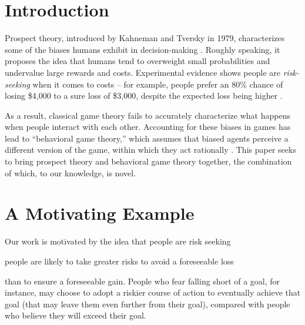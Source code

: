 \documentclass[twoside]{article}
\begin{document}
\begin{multicols}{2} %

\section{Introduction}
Prospect theory, introduced by Kahneman and Tversky in 1979, characterizes some
of the biases humans exhibit in decision-making \cite{Kahneman1979}. Roughly
speaking, it proposes the idea that humans tend to overweight small
probabilities and undervalue large rewards and costs. Experimental evidence
shows people are \textit{risk-seeking} when it comes to costs -- for example,
people prefer an 80\% chance of losing \$4,000 to a sure loss of \$3,000,
despite the expected loss being higher \cite{Kahneman1979}.

As a result, classical game theory fails to accurately characterize what happens
when people interact with each other. Accounting for these biases in games has
lead to ``behavioral game theory,'' which assumes that biased agents perceive a
different version of the game, within which they act rationally \cite{Meir2014}.
This paper seeks to bring prospect theory and behavioral game theory together,
the combination of which, to our knowledge, is novel.

\section{A Motivating Example}

Our work is motivated by the idea that people are risk seeking 

people are likely to take greater risks to avoid a foreseeable loss

 than to ensure a foreseeable gain. People who fear falling short
of a goal, for instance, may choose to adopt a riskier course of action to eventually
achieve that goal (that may leave them even further from their goal), compared with
people who believe they will exceed their goal. 



\end{multicols}
\end{document}
